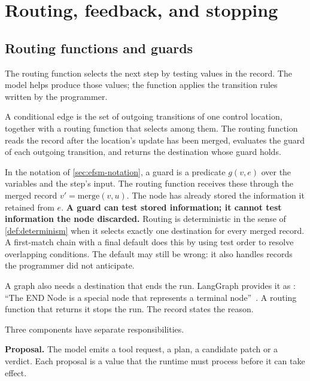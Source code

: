\section{Routing, feedback, and stopping}
\label{sec:control}

\subsection{Routing functions and guards}
\label{sec:control-routing}

The routing function selects the next step by testing values in the record. The model helps
produce those values; the function applies the transition rules written by the programmer.

\begin{definition}
\label{def:conditional-edge}
A conditional edge is the set of outgoing transitions of one control location, together with a
routing function that selects among them. The routing function reads the record after the
location's update has been merged, evaluates the guard of each outgoing transition, and returns the
destination whose guard holds.
\end{definition}

In the notation of \cref{sec:efsm-notation}, a guard is a predicate $g(v, e)$ over the variables and
the step's input. The routing function receives these through the merged record
$v' = \mathrm{merge}(v, u)$. The node has already stored the information it retained from $e$.
\textbf{A guard can test stored information; it cannot test information the node discarded.}
Routing is deterministic in the sense of \cref{def:determinism} when it selects exactly one
destination for every merged record. A first-match chain with a final default does this by using
test order to resolve overlapping conditions. The default may still be wrong: it also handles
records the programmer did not anticipate.

A graph also needs a destination that ends the run. LangGraph provides it as : ``The
END Node is a special node that represents a terminal node''~\citep{langgraph-graph-api}. A routing
function that returns it stops the run. The record states the reason.

Three components have separate responsibilities.

\bi

\item \textbf{Proposal.} The model emits a tool request, a plan, a candidate patch or a verdict.
Each proposal is a value that the runtime must process before it can take effect.

